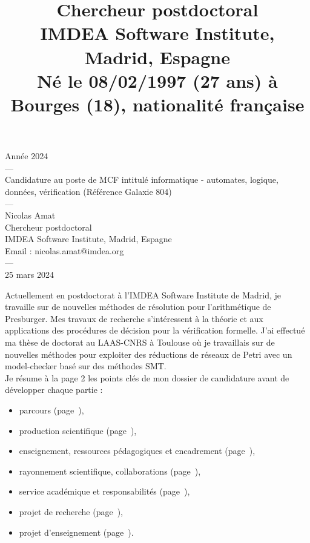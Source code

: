 \documentclass[11pt,a4paper]{moderncv}
\title{\normalsize  Chercheur postdoctoral\\
IMDEA Software Institute, Madrid, Espagne\\
Né le 08/02/1997 (27 ans) à Bourges (18), nationalité française\\
}
\begin{document}
\thispagestyle{empty}

\begin{center}
{\small Année 2024\\---\\
\huge Candidature au poste de MCF intitulé \og informatique - automates, logique, données, vérification\fg\medbreak
\Large(Référence Galaxie 804)\\
\small
---\\
\Large Nicolas Amat \\
\vspace{1em}
\small Chercheur postdoctoral\\
IMDEA Software Institute, Madrid, Espagne\\
    Email : nicolas.amat@imdea.org\\
---\\
25 mars 2024}
\end{center}

\newpage

\setcounter{page}{1}
\newpage

\makecvtitle

Actuellement en postdoctorat à l'IMDEA Software Institute de Madrid, je
travaille sur de nouvelles méthodes de résolution pour l'arithmétique de
Presburger. Mes travaux de recherche s'intéressent à la théorie et aux
applications des procédures de décision pour la vérification formelle. J'ai
effectué ma thèse de doctorat au LAAS-CNRS à Toulouse où je travaillais sur de
nouvelles méthodes pour exploiter des réductions de réseaux de Petri avec un
model-checker basé sur des méthodes SMT.\\

Je résume à la page 2 les points clés de mon dossier de candidature avant de
développer chaque partie :
\begin{itemize}
    \item parcours (page~\pageref{sec:formation}),
    \item production scientifique (page~\pageref{sec:recherche}), 
    \item enseignement, ressources pédagogiques et encadrement (page~\pageref{sec:enseignements}),
    \item rayonnement scientifique, collaborations (page~\pageref{sec:rayonnement}),
    \item service académique et responsabilités (page~\pageref{sec:resp}),
    \item projet de recherche (page~\pageref{sec:projet_recherche}),
    \item projet d'enseignement (page~\pageref{sec:projet_enseignement}).\\
\end{itemize}
\end{document}

